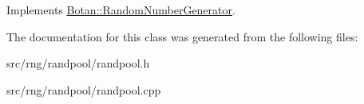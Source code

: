 Implements \hyperlink{classBotan_1_1RandomNumberGenerator_a2d4e91943829d64593ee4ce4251fd57b}{Botan\-::\-Random\-Number\-Generator}.



The documentation for this class was generated from the following files\-:\begin{DoxyCompactItemize}
\item 
src/rng/randpool/randpool.\-h\item 
src/rng/randpool/randpool.\-cpp\end{DoxyCompactItemize}
